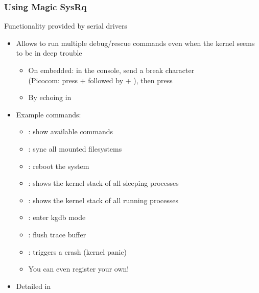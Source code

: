 \begin{frame}[fragile]
  \frametitle{Using Magic SysRq}
  Functionality provided by serial drivers
  \begin{itemize}
  \item Allows to run multiple debug/rescue commands even when the
    kernel seems to be in deep trouble
    \begin{itemize}
      \item On embedded: in the console, send a break character\\
        (Picocom: press \code{[Ctrl]} +  followed by \code{[Ctrl]}
        + \code{\ }), then press 
       \item By echoing  in 
    \end{itemize}
  \item Example commands:
    \begin{itemize}
    \item {}: show available commands
    \item {}: sync all mounted filesystems
    \item {}: reboot the system
    \item {}: shows the kernel stack of all sleeping processes
    \item {}: shows the kernel stack of all running processes
    \item {}: enter kgdb mode
    \item {}: flush trace buffer
    \item {}: triggers a crash (kernel panic)
    \item You can even register your own!
    \end{itemize}
  \item Detailed in 
  \end{itemize}
\end{frame}




